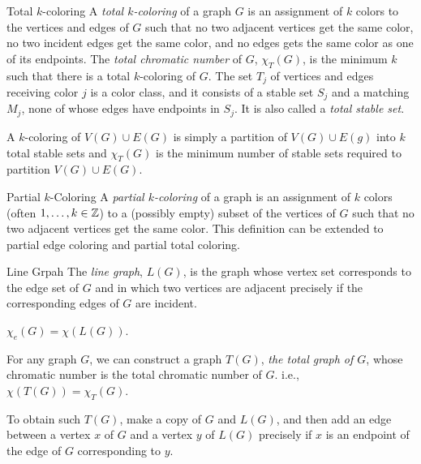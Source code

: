 \begin{df}{Total $k$-coloring}
	A \textit{total $k$-coloring} of a graph $G$ is an assignment of $k$ colors to the vertices and edges of $G$ such that no two adjacent vertices get the same color, no two incident edges get the same color, and no edges gets the same color as one of its endpoints. The \textit{total chromatic number} of $G$, $\chi_T(G)$, is the minimum $k$ such that there is a total $k$-coloring of $G$. The set $T_j$ of vertices and edges receiving color $j$ is a color class, and it consists of a stable set $S_j$ and a matching $M_j$, none of whose edges have endpoints in $S_j$. It is also called a \textit{total stable set}.	
\end{df}
\begin{rmk}
	A $k$-coloring of $V(G)\cup E(G)$ is simply a partition of $V(G)\cup E(g)$ into $k$ total stable sets and $\chi_T(G)$ is the minimum number of stable sets required to partition $V(G)\cup E(G)$.	
\end{rmk}
\begin{df}{Partial $k$-Coloring}
	A \textit{partial $k$-coloring} of a graph is an assignment of $k$ colors (often $1,\dots,k\in{\mathbb{Z}}$) to a (possibly empty) subset of the vertices of $G$ such that no two adjacent vertices get the same color. This definition can be extended to partial edge coloring and partial total coloring.	
\end{df}
\begin{df}{Line Grpah}
	The \textit{line graph}, $L(G)$, is the graph whose vertex set corresponds to the edge set of $G$ and in which two vertices are adjacent precisely if the corresponding edges of $G$ are incident.	
\end{df}
\begin{cor}{}
	$\chi_e(G)=\chi(L(G))$.
\end{cor}
\begin{prop}{}
	For any graph $G$, we can construct a graph $T(G)$, \textit{the total graph of $G$}, whose chromatic number is the total chromatic number of $G$. i.e., $\chi(T(G))=\chi_T(G)$.	
\end{prop}
\begin{prf}	
	To obtain such $T(G)$, make a copy of $G$ and $L(G)$, and then add an edge between a vertex $x$ of $G$ and a vertex $y$ of $L(G)$ precisely if $x$ is an endpoint of the edge of $G$ corresponding to $y$.
\end{prf}

